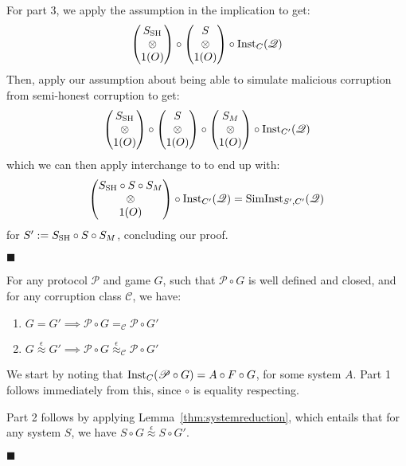 \begin{theorem}
  For part 3, we apply the assumption in the implication to get:
  $$
  \begin{pmatrix}
    S_{\text{SH}}\cr
    \otimes\cr
    1(O)
  \end{pmatrix}
  \circ
  \begin{pmatrix}
    S\cr
    \otimes\cr
    1(O)
  \end{pmatrix}
  \circ \text{Inst}_{C}(\mathscr{Q})
  $$
  Then, apply our assumption about being able to simulate malicious corruption
  from semi-honest corruption to get:
  $$
  \begin{pmatrix}
    S_{\text{SH}}\cr
    \otimes\cr
    1(O)
  \end{pmatrix}
  \circ
  \begin{pmatrix}
    S\cr
    \otimes\cr
    1(O)
  \end{pmatrix}
  \circ
  \begin{pmatrix}
    S_M\cr
    \otimes\cr
    1(O)
  \end{pmatrix}
  \circ \text{Inst}_{C'}(\mathscr{Q})
  $$
  which we can then apply interchange to to end up with:
  $$
  \begin{pmatrix}
    S_{\text{SH}} \circ S \circ S_M\cr
    \otimes\cr
    1(O)
  \end{pmatrix}
  \circ \text{Inst}_{C'}(\mathscr{Q})
  = \text{SimInst}_{S', C'}(\mathscr{Q})
  $$
  for $S' := S_{\text{SH}} \circ S \circ S_M$, concluding our proof.

  $\blacksquare$
\end{theorem}

\begin{theorem}
  \label{thm:vertical_composition_theorem}
  For any protocol $\mathscr{P}$ and game $G$, such that $\mathscr{P} \circ G$
  is well defined and closed, and for any corruption class $\mathscr{C}$, we have:
  \begin{enumerate}
    \item $G = G' \implies \mathscr{P} \circ G =_{\mathscr{C}} \mathscr{P} \circ G'$
    \item $G \overset{\epsilon}{\approx} G' \implies \mathscr{P} \circ G \overset{\epsilon}{\approx}_{\mathscr{C}} \mathscr{P} \circ G'$
  \end{enumerate}
  
 We start by noting that $\text{Inst}_C(\mathscr{P} \circ G) = A \circ F \circ G$,
for some system $A$.
Part 1 follows immediately from this, since $\circ$ is equality respecting.

Part 2 follows by applying Lemma~\ref{thm:systemreduction},
which entails that for any system $S$, we have $S \circ G \overset{\epsilon}{\approx} S \circ G'$.

$\blacksquare$
\end{theorem}

